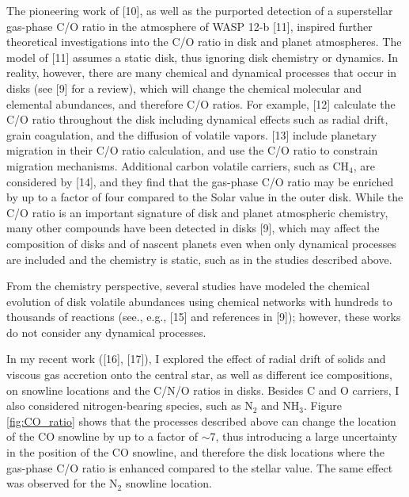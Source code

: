 \documentclass[12pt, letterpaper]{article}
\begin{document}
The pioneering work of [10], as well as the purported detection of a superstellar gas-phase C/O ratio in the atmosphere of WASP 12-b [11], inspired further theoretical investigations into the C/O ratio in disk and planet atmospheres. The model of [11] assumes a static disk, thus ignoring disk chemistry or dynamics. In reality, however, there are many chemical and dynamical processes that occur in disks (see [9] for a review), which will change the chemical molecular and elemental abundances, and therefore C/O ratios. For example, [12] calculate the C/O ratio throughout the disk including dynamical effects such as radial drift, grain coagulation, and the diffusion of volatile vapors. [13] include planetary migration in their C/O ratio calculation, and use the C/O ratio to constrain migration mechanisms. Additional carbon volatile carriers, such as CH$_4$, are considered by [14],  and they find that the gas-phase C/O ratio may be enriched by up to a factor of four compared to the Solar value in the outer disk.  While the C/O ratio is an important signature of disk and planet atmospheric chemistry, many other compounds have been detected in disks [9], which may affect the composition of disks and of nascent planets even when only dynamical processes are included and the chemistry is static, such as in the studies described above. 

From the chemistry perspective, several studies have modeled the chemical evolution of disk volatile abundances using chemical networks with hundreds to thousands of reactions (see., e.g., [15] and references in [9]); however, these works do not consider any dynamical processes.   

In my recent work ([16], [17]), I explored the effect of radial drift of solids and viscous gas accretion onto the central star, as well as different ice compositions, on snowline locations and the C/N/O ratios in disks. Besides C and O carriers, I also considered nitrogen-bearing species, such as N$_2$ and NH$_3$. Figure \ref{fig:CO_ratio} shows that the processes described above can change the location of the CO snowline by up to a factor of $\sim$7, thus introducing a large uncertainty in the position of the CO snowline, and therefore the disk locations where the gas-phase C/O ratio is enhanced compared to the stellar value. The same effect was observed for the N$_2$ snowline location.
\end{document}
